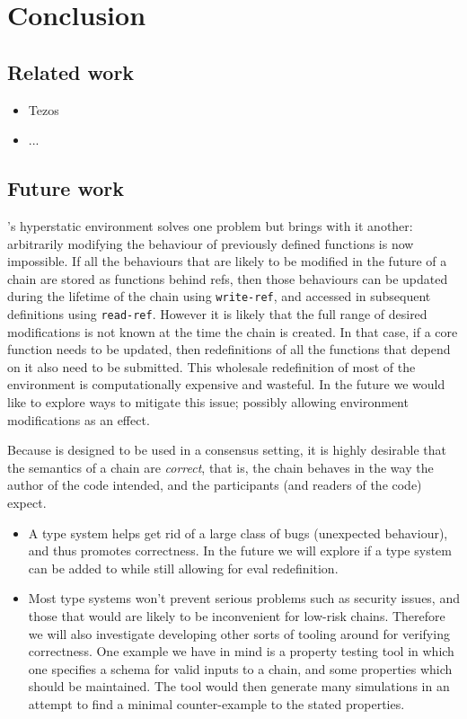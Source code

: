 \section{Conclusion}

\subsection{Related work}

\begin{itemize}
  \item Tezos
  \item ...
\end{itemize}

\subsection{Future work}

\rad's hyperstatic environment solves one problem but brings with it another:
arbitrarily modifying the behaviour of previously defined functions is now
impossible. If all the behaviours that are likely to be modified in the future of
a chain are stored as functions behind refs, then those behaviours can be
updated during the lifetime of the chain using \texttt{write-ref}, and accessed
in subsequent definitions using \texttt{read-ref}. However it is likely that the
full range of desired modifications is not known at the time the chain is
created. In that case, if a core function needs to be updated, then
redefinitions of all the functions that depend on it also need to be submitted.
This wholesale redefinition of most of the environment is computationally
expensive and wasteful. In the future we would like to explore ways to mitigate
this issue; possibly allowing environment modifications as an effect.

Because \rad{} is designed to be used in a consensus setting, it is highly
desirable that the semantics of a chain are \emph{correct}, that is, the chain
behaves in the way the author of the code intended, and the participants (and
readers of the code) expect.

\begin{itemize}
\item A type system helps get rid of a large class of bugs (unexpected
  behaviour), and thus promotes correctness. In the future we will explore if a
  type system can be added to \rad{} while still allowing for eval redefinition.
\item Most type systems won't prevent serious problems such as security issues,
  and those that would are likely to be inconvenient for low-risk chains.
  Therefore we will also investigate developing other sorts of tooling around
  \rad{} for verifying correctness. One example we have in mind is a property
  testing tool in which one specifies a schema for valid inputs to a chain, and
  some properties which should be maintained. The tool would then generate many
  simulations in an attempt to find a minimal counter-example to the stated
  properties.
\end{itemize}